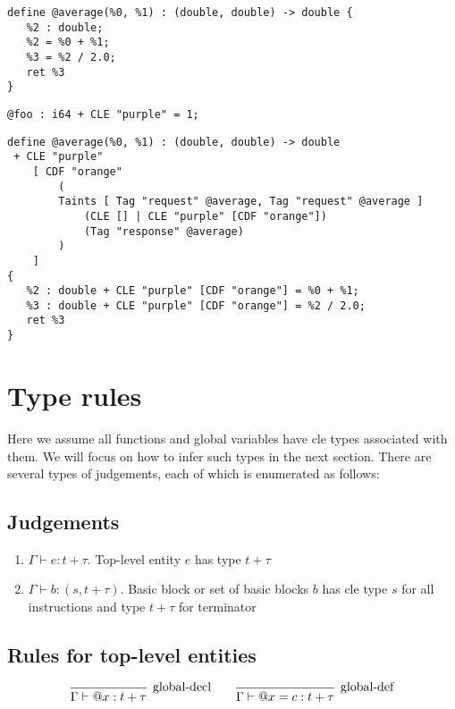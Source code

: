 \documentclass{article}
\begin{document}
\begin{verbatim}
define @average(%0, %1) : (double, double) -> double {
   %2 : double;
   %2 = %0 + %1;
   %3 = %2 / 2.0;
   ret %3
}
\end{verbatim}

\begin{verbatim}
@foo : i64 + CLE "purple" = 1;
\end{verbatim}


\begin{verbatim}
define @average(%0, %1) : (double, double) -> double
 + CLE "purple" 
    [ CDF "orange"
        ( 
        Taints [ Tag "request" @average, Tag "request" @average ] 
            (CLE [] | CLE "purple" [CDF "orange"])
            (Tag "response" @average)
        )    
    ]  
{
   %2 : double + CLE "purple" [CDF "orange"] = %0 + %1;
   %3 : double + CLE "purple" [CDF "orange"] = %2 / 2.0;
   ret %3
}
\end{verbatim}

\section{Type rules}

Here we assume all functions and global variables have cle types associated with them. We will focus on how to infer such types in the next section. There are several types of judgements, each of which is enumerated as follows:

\subsection{Judgements}
\begin{enumerate}
    \item $\Gamma \vdash e : t + \tau$. Top-level entity $e$ has type $t + \tau$
    \item $\Gamma \vdash b : (s, t + \tau)$. Basic block or set of basic blocks $b$ has cle type $s$ for all instructions and type $t + \tau$ for terminator
\end{enumerate}

\subsection{Rules for top-level entities}

\[    
\begin{prooftree}
    \infer0[global-decl]{\Gamma \vdash @x : t + \tau}
\end{prooftree}
\qquad
\begin{prooftree}
    \infer0[global-def]{\Gamma \vdash @x = c : t + \tau}
\end{prooftree}
\]
\end{document}
